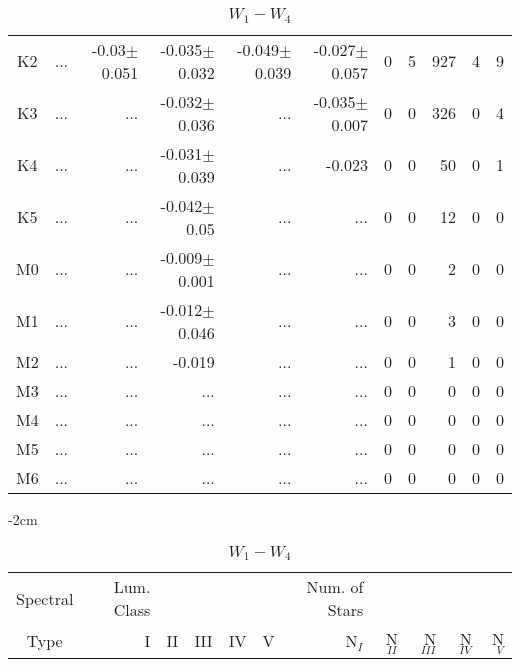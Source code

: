 \begin{table}[t]
\begin{table}[t]
\begin{center}
\begin{tabular}{c|rrrrr|rrrrr}
    K2	&	 ...	&	-0.03$\pm$0.051	&	-0.035$\pm$0.032	&	-0.049$\pm$0.039	&	-0.027$\pm$0.057	&	0	&	5	&	927	&	4	&	9	\\
    K3	&	 ...	&	 ...	&	-0.032$\pm$0.036	&	 ...	&	-0.035$\pm$0.007	&	0	&	0	&	326	&	0	&	4	\\
    K4	&	 ...	&	 ...	&	-0.031$\pm$0.039	&	 ...	&	-0.023	&	0	&	0	&	50	&	0	&	1	\\
    K5	&	 ...	&	 ...	&	-0.042$\pm$0.05	&	 ...	&	 ...	&	0	&	0	&	12	&	0	&	0	\\
    M0	&	 ...	&	 ...	&	-0.009$\pm$0.001	&	 ...	&	 ...	&	0	&	0	&	2	&	0	&	0	\\
    M1	&	 ...	&	 ...	&	-0.012$\pm$0.046	&	 ...	&	 ...	&	0	&	0	&	3	&	0	&	0	\\
    M2	&	 ...	&	 ...	&	-0.019	&	 ...	&	 ...	&	0	&	0	&	1	&	0	&	0	\\
    M3	&	 ...	&	 ...	&	 ...	&	 ...	&	 ...	&	0	&	0	&	0	&	0	&	0	\\
    M4	&	 ...	&	 ...	&	 ...	&	 ...	&	 ...	&	0	&	0	&	0	&	0	&	0	\\
    M5	&	 ...	&	 ...	&	 ...	&	 ...	&	 ...	&	0	&	0	&	0	&	0	&	0	\\
    M6	&	 ...	&	 ...	&	 ...	&	 ...	&	 ...	&	0	&	0	&	0	&	0	&	0	\\
        \bottomrule
        \end{tabular}
    \end{center}
    \end{table}
    
    
    \begin{table}[t]
    \tiny
    \centering
    \caption{$W_{1}-W_{4}$}
    \begin{center}
        \addtolength{\leftskip} {-2cm}
        \addtolength{\rightskip}{-2cm}
        \begin{tabular}{c|rrrrr|rrrrr}
        \toprule
        Spectral & Lum. Class & & & & & Num. of Stars & & & &  \\
        Type & I & II & III &  IV & V & N$_{I}$ & N$_{II}$ & N$_{III}$ & N$_{IV}$ & N$_{V}$ \\ \midrule
     

\end{tabular}
\end{center}
\end{table}
\end{table}
